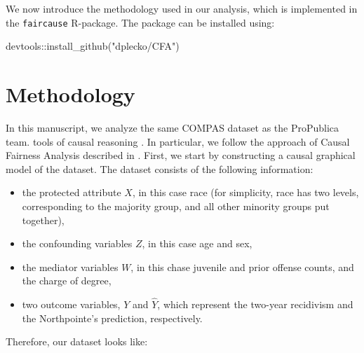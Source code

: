 \documentclass{article}
\newenvironment{Shaded}{\begin{snugshade}}{\end{snugshade}}
\newcommand{\FunctionTok}[1]{\textcolor[rgb]{0.00,0.00,0.00}{#1}}
\newcommand{\NormalTok}[1]{#1}
\newcommand{\SpecialCharTok}[1]{\textcolor[rgb]{0.00,0.00,0.00}{#1}}
\newcommand{\StringTok}[1]{\textcolor[rgb]{0.31,0.60,0.02}{#1}}
\providecommand{\tightlist}{%
  \setlength{\itemsep}{0pt}\setlength{\parskip}{0pt}}
\begin{document}
We now introduce the methodology used in our analysis, which is
implemented in the \texttt{faircause} R-package. The package can be
installed using:

\begin{Shaded}
\begin{Highlighting}[]
\NormalTok{devtools}\SpecialCharTok{::}\FunctionTok{install\_github}\NormalTok{(}\StringTok{"dplecko/CFA"}\NormalTok{)}
\end{Highlighting}
\end{Shaded}

\hypertarget{methodology}{%
\section{Methodology}\label{methodology}}

In this manuscript, we analyze the same COMPAS dataset as the ProPublica
team. tools of causal reasoning \cite{pearl:2k}. In particular, we
follow the approach of Causal Fairness Analysis described in
\cite{plecko2022causal}. First, we start by constructing a causal
graphical model of the dataset. The dataset consists of the following
information:

\begin{itemize}
\tightlist
\item
  the protected attribute \(X\), in this case race (for simplicity, race
  has two levels, corresponding to the majority group, and all other
  minority groups put together),
\item
  the confounding variables \(Z\), in this case age and sex,
\item
  the mediator variables \(W\), in this chase juvenile and prior offense
  counts, and the charge of degree,
\item
  two outcome variables, \(Y\) and \(\hat{Y}\), which represent the
  two-year recidivism and the Northpointe's prediction, respectively.
\end{itemize}

Therefore, our dataset looks like:
\end{document}
